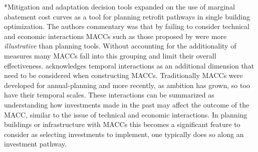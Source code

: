 \documentclass[twocolumn, a4paper,10pt]{article}
\makeatletter
\renewcommand\subsection{\@startsection{subsection}{1}{\z@}{\z@}{\z@}{\normalfont\normalsize\bfseries}}
\renewcommand\subsection{\@startsection{subsection}{1}{\z@}{\z@}{0.1pt}{\normalfont\normalsize\bfseries}}
\makeatother
\begin{document}

\subsection*{Mitigation and adaptation decision tools}
\citet{rysanek_using_2013} expanded on the use of marginal abatement cost curves as a tool for planning retrofit pathways in single building optimization. The authors commentary was that by failing to consider technical and economic interactions MACCs such as those proposed by \citet{mckinsey__co_climate_2010} were more \textit{illustrative} than planning tools. Without accounting for the additionality of measures many MACCs fall into this grouping and limit their overall effectiveness. \citet{kesicki_marginal_2012} acknowledges temporal interactions as an additional dimension that need to be considered when constructing MACCs. Traditionally MACCs were developed for annual-planning and more recently, as ambition has grown, so too have their temporal scales. These interactions can be summarized as understanding how investments made in the past may affect the outcome of the MACC, similar to the issue of technical and economic interactions. In planning buildings or infrastructure with MACCs this becomes a significant feature to consider as selecting investments to implement, one typically does so along an investment pathway. 
\end{document}
